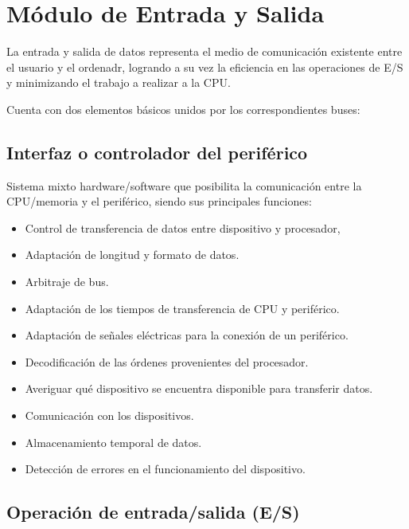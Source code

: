 \documentclass[a4paper, 11pt, titlepage]{article}
\begin{document}
\section{Módulo de Entrada y Salida}\label{entradasalida}

    La entrada y salida de datos representa el medio de comunicación existente entre el usuario y el 
    ordenadr, logrando a su vez la eficiencia en las operaciones de E/S y minimizando el trabajo a 
    realizar a la CPU.

    Cuenta con dos elementos básicos unidos por los correspondientes buses:

    \subsection{Interfaz o controlador del periférico}

        Sistema mixto hardware/software que posibilita la comunicación entre la CPU/memoria y el 
        periférico, siendo sus principales funciones:

        \begin{itemize}
            \item Control de transferencia de datos entre dispositivo y procesador,
            \item Adaptación de longitud y formato de datos.
            \item Arbitraje de bus.
            \item Adaptación de los tiempos de transferencia de CPU y periférico.
            \item Adaptación de señales eléctricas para la conexión de un periférico.
            \item Decodificación de las órdenes provenientes del procesador.
            \item Averiguar qué dispositivo se encuentra disponible para transferir datos.
            \item Comunicación con los dispositivos.
            \item Almacenamiento temporal de datos.
            \item Detección de errores en el funcionamiento del dispositivo.
        \end{itemize}

    \subsection{Operación de entrada/salida (E/S)}
\end{document}
